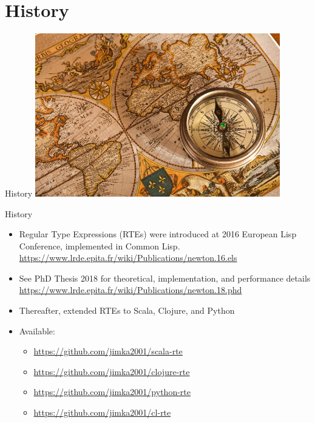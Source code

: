 \section{History}
\begin{frame}{History}
  \centering
  \includegraphics[width=0.8\textwidth]{history.jpg}
\end{frame}

\begin{frame}{History}
  \begin{itemize}
  \item Regular Type Expressions (RTEs) were introduced at 2016 European Lisp Conference, implemented in Common Lisp.
    \url{https://www.lrde.epita.fr/wiki/Publications/newton.16.els}
  \item See PhD Thesis 2018 for theoretical, implementation, and performance details
    \url{https://www.lrde.epita.fr/wiki/Publications/newton.18.phd}
  \item Thereafter, extended RTEs to Scala, Clojure, and Python
  \item Available:
    \begin{itemize}
    \item \url{https://github.com/jimka2001/scala-rte}
    \item \url{https://github.com/jimka2001/clojure-rte}
    \item \url{https://github.com/jimka2001/python-rte}
    \item \url{https://github.com/jimka2001/cl-rte}
    \end{itemize}
  \end{itemize}
\end{frame}


